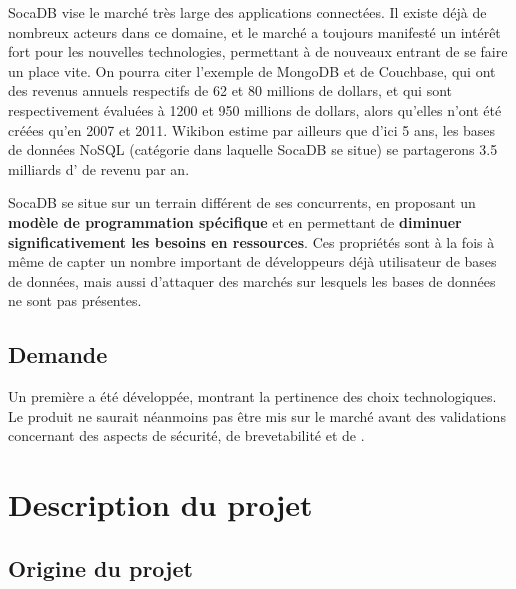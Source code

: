 \documentclass[a4paper,10pt]{scrreprt}
\begin{document}
        SocaDB vise le marché très large des applications connectées. Il existe déjà de nombreux acteurs dans ce domaine, et le marché a toujours manifesté un intérêt fort pour les nouvelles technologies, permettant à de nouveaux entrant de se faire un place vite. On pourra citer l'exemple de MongoDB et de Couchbase, qui ont des revenus annuels respectifs de 62 et 80 millions de dollars, et qui sont respectivement évaluées à 1200 et 950 millions de dollars, alors qu'elles n'ont été créées qu'en 2007 et 2011. Wikibon estime par ailleurs que d'ici 5 ans, les bases de données NoSQL (catégorie dans laquelle SocaDB se situe) se partagerons 3.5 milliards d'\texteuro{} de revenu par an.

        SocaDB se situe sur un terrain différent de ses concurrents, en proposant un \textbf{modèle de programmation spécifique} et en permettant de \textbf{diminuer significativement les besoins en ressources}. Ces propriétés sont à la fois à même de capter un nombre important de développeurs déjà utilisateur de bases de données, mais aussi d'attaquer des marchés sur lesquels les bases de données ne sont pas présentes.
        
    \section*{Demande} %
    
        Un première a été développée, montrant la pertinence des choix technologiques. Le produit ne saurait néanmoins pas être mis sur le marché avant des validations concernant des aspects de sécurité, de brevetabilité et de \jesaispas.

\chapter{Description du projet}

    \section{Origine du projet}
\end{document}
